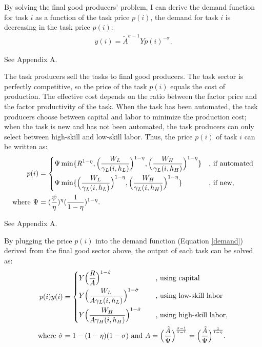 \documentclass[12pt]{article}
\begin{document}
By solving the final good producers' problem, I can derive the demand function for task $i$ as a function of the task price $p(i)$, the demand for task $i$ is decreasing in the task price $p(i)$:
\begin{align}
\label{demand}
y(i) = \tilde{A}^{\sigma-1}Yp(i)^{-\sigma}.
\end{align}

 See Appendix A.

The task producers sell the tasks to final good producers. The task sector is perfectly competitive, so the price of the task $p(i)$ equals the cost of production. The effective cost depends on the ratio between the factor price and the factor productivity of the task. When the task has been automated, the task producers choose between capital and labor to minimize the production cost; when the task is new and has not been automated, the task producers can only select between high-skill and low-skill labor. Thus, the price $p(i)$ of task $i$ can be written as: 
\begin{align*}
p(i) &= 
\begin{dcases}
\Psi \min\{R^{1-\eta},\Big(\frac{W_L}{\gamma_L(i,h_L)}\Big)^{1-\eta},\Big(\frac{W_H}{\gamma_L(i,h_H)}\Big)^{1-\eta}\} &\text{, if automated}  \\
\Psi \min\{\Big(\frac{W_L}{\gamma_L(i,h_L)}\Big)^{1-\eta},\Big(\frac{W_H}{\gamma_L(i,h_H)}\Big)^{1-\eta}\} &\text{, if new,} 
\end{dcases} \\
\text{where } \Psi &= (\frac{\psi}{\eta})^{\eta}(\frac{1}{1-\eta})^{1-\eta}.
\end{align*}

 
 See Appendix A.

By plugging the price $p(i)$ into the demand function (Equation \ref{demand}) derived from the final good sector above, the output of each task can be solved as: 
\begin{align*}
p(i)y(i) &= 
\begin{dcases}
Y\Big(\frac{R}{A}\Big)^{1-\hat{\sigma}} &\quad  \text{, using capital}  \\
Y\Big(\frac{W_L}{A\gamma_L(i,h_L)}\Big)^{1-\hat{\sigma}} &\quad  \text{, using low-skill labor}    \\
Y\Big(\frac{W_H}{A\gamma_H(i,h_H)}\Big)^{1-\hat{\sigma}} &\quad  \text{, using high-skill labor}, 
\end{dcases} \\
\text{where } \hat{\sigma} &= 1-(1-\eta)(1-\sigma)\text{ and } A = \Big(\frac{\tilde{A}}{\Psi}\Big)^{\frac{\sigma-1}{\hat{\sigma}-1}}  = \Big(\frac{\tilde{A}}{\Psi}\Big)^{\frac{1}{1-\eta}}.
\end{align*}
\end{document}
